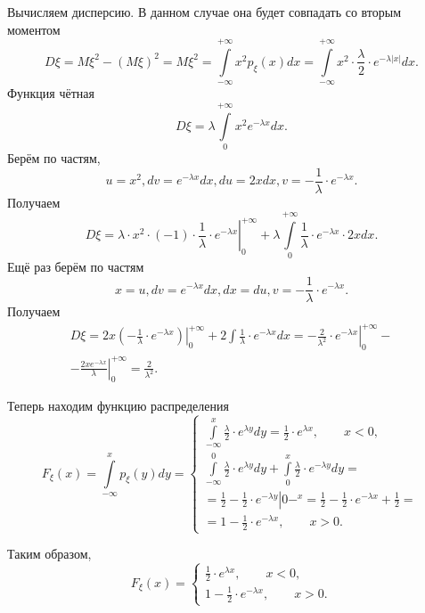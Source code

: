Вычисляем дисперсию.
В данном случае она будет совпадать со вторым моментом
$$D \xi =
M \xi^2 - \left( M \xi \right)^2 =
M \xi^2 =
\int \limits_{- \infty }^{+ \infty } x^2 p_{ \xi } \left( x \right) dx =
\int \limits_{- \infty }^{+ \infty } x^2 \cdot \frac{ \lambda }{2} \cdot e^{- \lambda \left| x \right| } dx.$$
Функция чётная
$$D \xi =
\lambda \int \limits_0^{+ \infty } x^2 e^{- \lambda x} dx.$$
Берём по частям,
$$u = x^2,
dv = e^{- \lambda x} dx,
du = 2xdx,
v = - \frac{1}{ \lambda } \cdot e^{- \lambda x}.$$
Получаем
$$D \xi =
\left. \lambda \cdot x^2 \cdot \left( -1 \right) \cdot \frac{1}{ \lambda } \cdot e^{- \lambda x} \right|_0^{+ \infty } +
\lambda \int \limits_0^{+ \infty } \frac{1}{ \lambda } \cdot e^{- \lambda x} \cdot 2xdx.$$
Ещё раз берём по частям
$$x = u,
dv = e^{- \lambda x}dx,
dx = du,
v = - \frac{1}{ \lambda } \cdot e^{- \lambda x}.$$
Получаем
\begin{equation*}
\begin{split}
D \xi =
\left. 2x \left( - \frac{1}{ \lambda } \cdot e^{- \lambda x} \right) \right|_0^{+ \infty } +
2 \int \frac{1}{ \lambda } \cdot e^{- \lambda x} dx =
\left. - \frac{2}{ \lambda^2} \cdot e^{- \lambda x} \right|_0^{+ \infty } - \\
- \left. \frac{2xe^{- \lambda x}}{ \lambda } \right|_0^{+ \infty } =
\frac{2}{ \lambda^2}.
\end{split}
\end{equation*}

Теперь находим функцию распределения
$$F_{ \xi } \left( x \right) =
\int \limits_{- \infty }^{x} p_{ \xi } \left( y \right) dy =
\begin{cases}
\int \limits_{- \infty }^x \frac{ \lambda }{2} \cdot e^{ \lambda y} dy =
\frac{1}{2} \cdot e^{ \lambda x}, \qquad x < 0, \\
\int \limits_{- \infty }^0 \frac{ \lambda }{2} \cdot e^{ \lambda y} dy + \int \limits_0^x \frac{ \lambda }{2} \cdot e^{- \lambda y} dy = \\
= \left. \frac{1}{2} - \frac{1}{2} \cdot e^{- \lambda y} \right|0-^x =
\frac{1}{2} - \frac{1}{2} \cdot e^{- \lambda x} + \frac{1}{2} = \\
= 1 - \frac{1}{2} \cdot e^{- \lambda x}, \qquad x > 0.
\end{cases}$$

Таким образом,
$$F_{ \xi } \left( x \right) =
\begin{cases}
\frac{1}{2} \cdot e^{ \lambda x}, \qquad x < 0, \\
1 - \frac{1}{2} \cdot e^{- \lambda x}, \qquad x > 0.
\end{cases}$$

